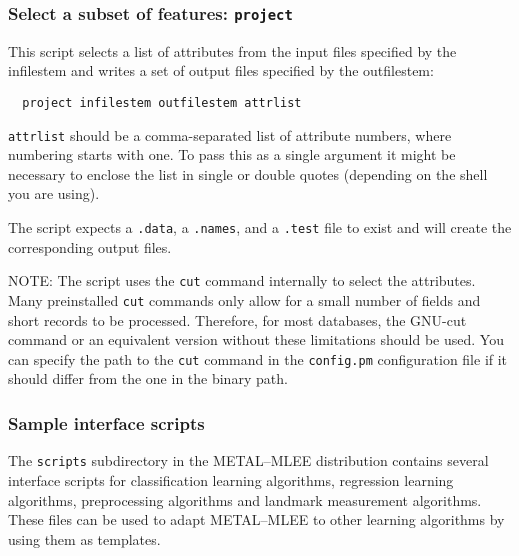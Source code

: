 \documentclass[a4paper,10pt,twoside]{article}
\newcommand{\eenameshort}{\textsf{METAL--MLEE}}
\begin{document}
\subsubsection{Select a subset of features: \texttt{project}}

This script selects a list of attributes from the input files specified
by the infilestem and writes a set of output files specified by the outfilestem:

\begin{verbatim}
  project infilestem outfilestem attrlist
\end{verbatim}

\verb=attrlist= should be a comma-separated list of attribute numbers,
where numbering starts with one. To pass this as a single argument
it might be necessary to enclose the list in single or double quotes
(depending on the shell you are using).

The script expects a \texttt{.data}, a \texttt{.names}, and a 
\texttt{.test} file to exist and will create the corresponding 
output files.

NOTE: The script uses the \texttt{cut} command internally to 
select the attributes. Many preinstalled \texttt{cut} commands
only allow for a small number of fields and short records to be
processed. Therefore, for most databases, the GNU-cut command
or an equivalent version without these limitations should be
used. You can specify the path to the \texttt{cut} command 
in the \texttt{config.pm} configuration file if it should 
differ from the one in the binary path.

\subsubsection{Sample interface scripts}


The \texttt{scripts} subdirectory in the \eenameshort{} 
distribution contains several interface scripts for 
classification learning algorithms, regression learning
algorithms, preprocessing algorithms and landmark measurement
algorithms. These files can be used to adapt \eenameshort{}
to other learning algorithms by using them as templates.
\end{document}
